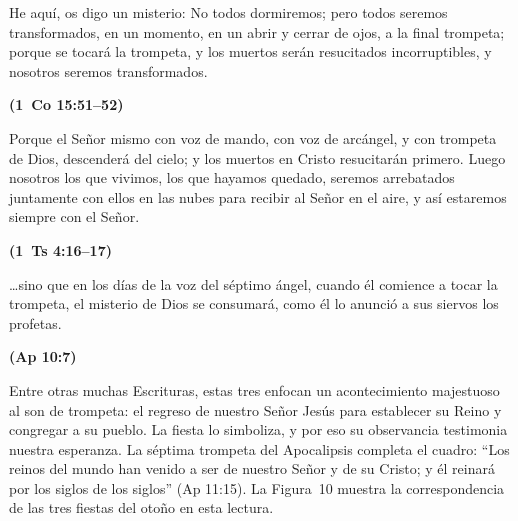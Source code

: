 \documentclass[11pt,letterpaper]{article}
\newcommand{\fuente}[1]{\par\hfill{\upshape\bfseries\small\textcolor{tierraroja}{#1}}}
\begin{document}
\begin{cita}He aquí, os digo un misterio: No todos dormiremos; pero todos seremos transformados, en un momento, en un abrir y cerrar de ojos, a la final trompeta; porque se tocará la trompeta, y los muertos serán resucitados incorruptibles, y nosotros seremos transformados.\fuente{(1~Co 15:51--52)}\end{cita}

\begin{cita}Porque el Señor mismo con voz de mando, con voz de arcángel, y con trompeta de Dios, descenderá del cielo; y los muertos en Cristo resucitarán primero. Luego nosotros los que vivimos, los que hayamos quedado, seremos arrebatados juntamente con ellos en las nubes para recibir al Señor en el aire, y así estaremos siempre con el Señor.\fuente{(1~Ts 4:16--17)}\end{cita}

\begin{cita}\ldots{}sino que en los días de la voz del séptimo ángel, cuando él comience a tocar la trompeta, el misterio de Dios se consumará, como él lo anunció a sus siervos los profetas.\fuente{(Ap 10:7)}\end{cita}

Entre otras muchas Escrituras, estas tres enfocan un acontecimiento majestuoso al son de trompeta: el regreso de nuestro Señor Jesús para establecer su Reino y congregar a su pueblo. La fiesta lo simboliza, y por eso su observancia testimonia nuestra esperanza. La séptima trompeta del Apocalipsis completa el cuadro: ``Los reinos del mundo han venido a ser de nuestro Señor y de su Cristo; y él reinará por los siglos de los siglos'' (Ap 11:15). La Figura~10 muestra la correspondencia de las tres fiestas del otoño en esta lectura.
\end{document}
